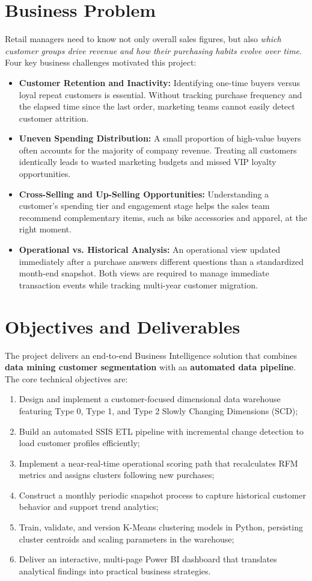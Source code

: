 \section{Business Problem}
Retail managers need to know not only overall sales figures, but also \emph{which customer groups drive revenue and how their purchasing habits evolve over time}. Four key business challenges motivated this project:
\begin{itemize}
  \item \textbf{Customer Retention and Inactivity:} Identifying one-time buyers versus loyal repeat customers is essential. Without tracking purchase frequency and the elapsed time since the last order, marketing teams cannot easily detect customer attrition.
  \item \textbf{Uneven Spending Distribution:} A small proportion of high-value buyers often accounts for the majority of company revenue. Treating all customers identically leads to wasted marketing budgets and missed VIP loyalty opportunities.
  \item \textbf{Cross-Selling and Up-Selling Opportunities:} Understanding a customer's spending tier and engagement stage helps the sales team recommend complementary items, such as bike accessories and apparel, at the right moment.
  \item \textbf{Operational vs. Historical Analysis:} An operational view updated immediately after a purchase answers different questions than a standardized month-end snapshot. Both views are required to manage immediate transaction events while tracking multi-year customer migration.
\end{itemize}

\section{Objectives and Deliverables}
The project delivers an end-to-end Business Intelligence solution that combines \textbf{data mining customer segmentation} with an \textbf{automated data pipeline}. The core technical objectives are:
\begin{enumerate}
  \item Design and implement a customer-focused dimensional data warehouse featuring Type 0, Type 1, and Type 2 Slowly Changing Dimensions (SCD);
  \item Build an automated SSIS ETL pipeline with incremental change detection to load customer profiles efficiently;
  \item Implement a near-real-time operational scoring path that recalculates RFM metrics and assigns clusters following new purchases;
  \item Construct a monthly periodic snapshot process to capture historical customer behavior and support trend analytics;
  \item Train, validate, and version K-Means clustering models in Python, persisting cluster centroids and scaling parameters in the warehouse;
  \item Deliver an interactive, multi-page Power BI dashboard that translates analytical findings into practical business strategies.
\end{enumerate}

